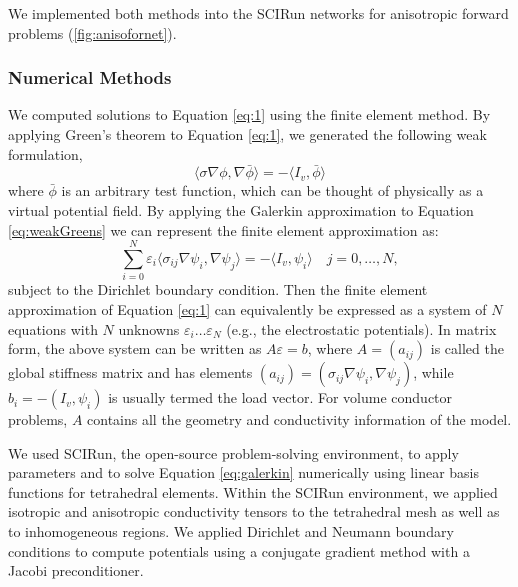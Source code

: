 We implemented both methods into the SCIRun networks for anisotropic forward problems (\ref{fig:anisofornet}).

\subsubsection{Numerical Methods}
\label{sec:numerical}


We computed solutions to Equation \ref{eq:1} using the finite element method. By applying Green's theorem to Equation \ref{eq:1}, we generated the following weak formulation,
\begin{equation}
\label{eq:weakGreens}
\langle \sigma \nabla \phi, \nabla \bar{\phi} \rangle = -\langle I_v, \bar{\phi} \rangle
\end{equation}
where $ \bar{\phi}$ is an arbitrary test function, which can be thought of physically as a virtual potential field. By applying the Galerkin approximation to Equation \ref{eq:weakGreens} we can represent the finite element approximation as:
\begin{equation}
\label{eq:galerkin}
\sum_{i = 0}^{N} \varepsilon_i \langle \sigma_{ij} \nabla \psi_{i}, \nabla \psi_{j} \rangle = -\langle I_v, \psi_i \rangle \quad j = 0, \dots, N,
\end{equation}
subject to the Dirichlet boundary condition. Then the finite element approximation of Equation \ref{eq:1} can equivalently be expressed as a system of $N$ equations with $N$ unknowns $\varepsilon_i \dots \varepsilon_N$ (e.g., the electrostatic potentials). In matrix form, the above system can be written as $A \varepsilon = b$,  where $A=(a_{ij})$ is called the global stiffness matrix and has elements $(a_{ij}) = (\sigma_{ij} \nabla \psi_{i}, \nabla \psi_{j})$, while $b_i = -(I_v, \psi_i)$ is usually termed the load vector. For volume conductor problems, $A$ contains all the geometry and conductivity information of the model. \cite{SCI:Joh2015c}

We used SCIRun, the open-source problem-solving environment, to apply parameters and to solve Equation \ref{eq:galerkin} numerically using linear basis functions for tetrahedral elements. Within the SCIRun environment, we applied isotropic and anisotropic conductivity tensors to the tetrahedral mesh as well as to inhomogeneous regions. We applied Dirichlet and Neumann boundary conditions to compute potentials using a conjugate gradient method with a Jacobi preconditioner.

